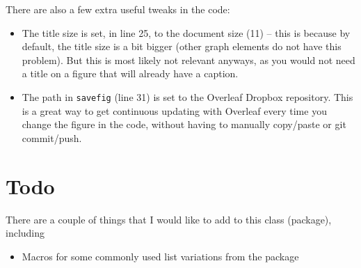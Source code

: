 \documentclass{notes}
\begin{document}
There are also a few extra useful tweaks in the code:
\begin{itemize}
    \item The title size is set, in line 25, to the document size (11) -- this is because by default, the title size is a bit bigger (other graph elements do not have this problem). But this is most likely not relevant anyways, as you would not need a title on a figure that will already have a caption.
    \item The path in \texttt{savefig} (line 31) is set to the Overleaf Dropbox repository. This is a great way to get continuous updating with Overleaf every time you change the figure in the code, without having to manually copy/paste or git commit/push.
\end{itemize}


\section{Todo}
There are a couple of things that I would like to add to this class (package), including
\begin{itemize}
    \item Macros for some commonly used list variations from the  package
\end{itemize}
\end{document}
